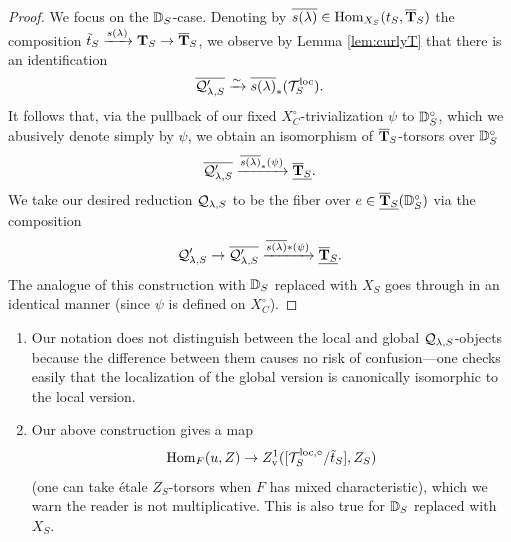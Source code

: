 \begin{proof}
We focus on the $\mathbb D_{S}$-case. Denoting by $\overline{s(\lambda)} \in \mathrm{Hom}_{X_{S}}(t_{S},\overline{\mathbf{T}}_{S})$ the composition $\tilde{t}_{S} \xrightarrow{s(\lambda)} \mathbf{T}_{S} \to \overline{\mathbf{T}}_{S}$, we observe by Lemma \ref{lem:curlyT} that there is an identification
\begin{equation*}
    \overline{\mathcal{Q}_{\lambda,S}'}  \xrightarrow{\sim} \overline{s(\lambda)}_{*}(\mathcal{T}_{S}^{\mathrm{loc}}).
\end{equation*}
It follows that, via the pullback of our fixed $X_{C}^{\circ}$-trivialization $\psi$ to $\mathbb D_{S}^{\circ}$, which we abusively denote simply by $\psi$, we obtain an isomorphism of $\overline{\mathbf{T}}_{S}$-torsors over $\mathbb D_{S}^{\circ}$
\begin{equation*}
    \overline{\mathcal{Q}_{\lambda,S}'} \xrightarrow{\overline{s(\lambda)}_{*}(\psi)} \underline{\overline{\mathbf{T}}_{S}}.
\end{equation*}
We take our desired reduction $\mathcal{Q}_{\lambda,S}$ to be the fiber over $e \in \underline{\overline{\mathbf{T}}_{S}}(\mathbb D_{S}^{\circ})$ via the composition
\begin{equation*}
     \mathcal{Q}_{\lambda,S}' \to \overline{\mathcal{Q}_{\lambda,S}'} \xrightarrow{\overline{s(\lambda)}{*}(\psi)} \underline{\overline{\mathbf{T}}_{S}}.
\end{equation*}
The analogue of this construction with $\mathbb D_{S}$ replaced with $X_{S}$ goes through in an identical manner (since $\psi$ is defined on $X_{C}^{\circ}$).
\end{proof}

\begin{rque}
\begin{enumerate}
    \item{Our notation does not distinguish between the local and global $\mathcal{Q}_{\lambda,S}$-objects because the difference between them causes no risk of confusion---one checks easily that the localization of the global version is canonically isomorphic to the local version.}
    \item{Our above construction gives a map
    \begin{equation*}
        \mathrm{Hom}_{F}(u,Z) \to Z^{1}_{\textnormal{v}}([\mathcal{T}_{S}^{\mathrm{loc},\circ}/\tilde{t}_{S}], Z_{S})
    \end{equation*}
    (one can take \'{e}tale $Z_{S}$-torsors when $F$ has mixed characteristic), which we warn the reader is not multiplicative. This is also true for $\mathbb D_{S}$ replaced with $X_{S}$.
    }
\end{enumerate}    
\end{rque}

